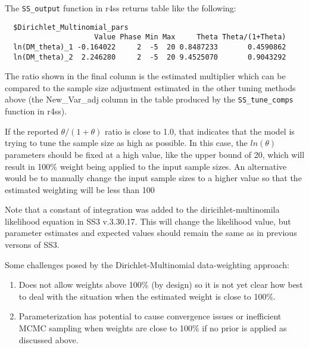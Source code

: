 The \texttt{SS\_output} function in r4ss returns table like the following:
\begin{small}
\begin{verbatim}
  $Dirichlet_Multinomial_pars
                     Value Phase Min Max     Theta Theta/(1+Theta)
  ln(DM_theta)_1 -0.164022     2  -5  20 0.8487233       0.4590862
  ln(DM_theta)_2  2.246280     2  -5  20 9.4525070       0.9043292
\end{verbatim}
\end{small}


The ratio shown in the final column is the estimated multiplier which can be compared to the sample size adjustment estimated in the other tuning methods above (the New\_Var\_adj column in the table produced by the \texttt{SS\_tune\_comps} function in r4ss).

If the reported $\theta/(1+\theta)$ ratio is close to 1.0, that indicates that the model is trying to tune the sample size as high as possible. In this case, the $ln(\theta)$ parameters should be fixed at a high value, like the upper bound of 20, which will result in 100\% weight being applied to the input sample sizes. An alternative would be to manually change the input sample sizes to a higher value so that the estimated weighting will be less than 100%

Note that a constant of integration was added to the diricihlet-multinomila likelihood equation in SS3 v.3.30.17. This will change the likelihood value, but parameter estimates and expected values should remain the same as in previous versons of SS3.

Some challenges posed by the Dirichlet-Multinomial data-weighting approach:
\begin{enumerate}
	\item Does not allow weights above 100\% (by design) so it is not yet clear how best to deal with the situation when the estimated weight is close to 100\%.
	\item Parameterization has potential to cause convergence issues or inefficient MCMC sampling when weights are close to 100\% if no prior is applied as discussed above.
\end{enumerate}